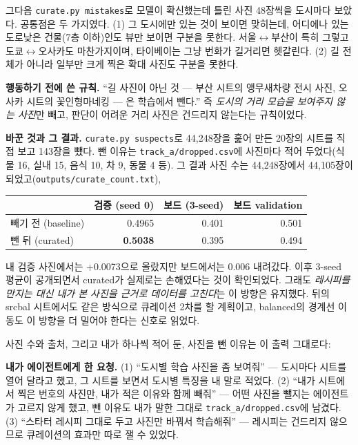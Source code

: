 \documentclass[11pt]{article}
\begin{document}
그다음 \texttt{curate.py mistakes}로 모델이 확신했는데 틀린 사진 48장씩을 도시마다
보았다. 공통점은 두 가지였다. (1) 그 도시에만 있는 것이 보이면 맞히는데, 어디에나 있는
도로\textperiodcentered{}낮은 건물(7층 이하)\textperiodcentered{}인도 뷰만 보이면 구분을 못한다. 서울$\leftrightarrow$부산이 특히 그렇고
도쿄$\leftrightarrow$오사카도 마찬가지이며, 타이베이는 그냥 번화가 길거리면 헷갈린다. (2) 길 전체가
아니라 일부만 크게 찍은 확대 사진도 구분을 못한다.

\textbf{행동하기 전에 쓴 규칙.} ``길 사진이 아닌 것 --- 부산 시트의 앵무새\textperiodcentered{}차량 전시
사진, 오사카 시트의 꽃\textperiodcentered{}인형\textperiodcentered{}마네킹 --- 은 학습에서 뺀다.'' 즉 \emph{도시의 거리 모습을
보여주지 않는 사진}만 빼고, 판단이 어려운 거리 사진은 건드리지 않는다는 규칙이었다.

\textbf{바꾼 것과 그 결과.} \texttt{curate.py suspects}로 44,248장을 훑어 만든 20장의
시트를 직접 보고 143장을 뺐다. 뺀 이유는 \texttt{track\_a/dropped.csv}에 사진마다
적어 두었다(식물 16, 실내 15, 음식 10, 차 9, 동물 4 등). 그 결과 사진 수는
44,248장에서 44,105장이 되었고(\texttt{outputs/curate\_count.txt}),
\begin{center}\small
\begin{tabular}{lrrr}
\toprule
& 검증 (seed 0) & 보드 (3-seed) & 보드 validation \\
\midrule
빼기 전 (baseline) & 0.4965 & 0.401 & 0.501 \\
뺀 뒤 (curated) & \textbf{0.5038} & 0.395 & 0.494 \\
\bottomrule
\end{tabular}
\end{center}
내 검증 사진에서는 +0.0073으로 올랐지만 보드에서는 0.006 내려갔다. 이후 3-seed 평균이
공개되면서 curated가 실제로는 손해였다는 것이 확인되었다. 그래도 \emph{레시피를 만지는
대신 내가 본 사진을 근거로 데이터를 고친다}는 이 방향은 유지했다. 뒤의 srcbal 시트에서도
같은 방식으로 큐레이션 2차를 할 계획이고, balanced의 경계선 이동도 이 방향을 더 밀어야
한다는 신호로 읽었다.

사진 수와 출처, 그리고 내가 하나씩 적어 둔, 사진을 뺀 이유는 이 출력 그대로다:


\textbf{내가 에이전트에게 한 요청.} (1) ``도시별 학습 사진을 좀 보여줘'' --- 도시마다
시트를 열어 달라고 했고, 그 시트를 보면서 도시별 특징을 내 말로 적었다.
(2) ``내가 시트에서 찍은 번호의 사진만, 내가 적은 이유와 함께 빼줘'' --- 어떤 사진을 뺄지는
에이전트가 고르지 않게 했고, 뺀 이유도 내가 말한 그대로 \texttt{track\_a/dropped.csv}에
남겼다. (3) ``스타터 레시피 그대로 두고 사진만 바꿔서 학습해줘'' --- 레시피는 건드리지
않으므로 큐레이션의 효과만 따로 잴 수 있었다.
\end{document}
